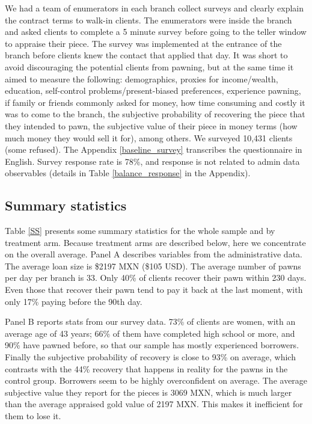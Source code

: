 \documentclass[oneside,11pt]{article}
\begin{document}
We had a team of enumerators in each branch collect surveys and clearly explain the contract terms to walk-in clients. The enumerators were inside the branch and asked clients to complete a 5 minute survey before going to the teller window to appraise their piece. The survey was implemented at the entrance of the branch before clients knew the contact that applied that day. It was short to avoid discouraging the potential clients from pawning, but at the same time it aimed to measure the following: demographics, proxies for income/wealth, education, self-control problems/present-biased preferences, experience pawning, if family or friends commonly asked for money, how time consuming and costly it was to come to the branch, the subjective probability of recovering the piece that they intended to pawn, the subjective value of their piece in money terms (how much money they would sell it for), among others. We surveyed 10,431 clients (some refused). %
The Appendix \ref{baseline_survey} transcribes the questionnaire in English. Survey response rate is 78\%, and response is not related to admin data observables (details in Table \ref{balance_response} in the Appendix).


\subsection{Summary statistics}

Table \ref{SS} presents some summary statistics for the whole sample and by treatment arm. Because treatment arms are described below, here we concentrate on the overall average. Panel A describes variables from the administrative data. The average loan size is \$2197 MXN (\$105 USD). The average number of pawns per day per branch is 33. Only 40\% of clients recover their pawn within 230 days. Even those that recover their pawn tend to pay it back at the last moment, with only 17\% paying before the 90th day.

Panel B reports stats from our survey data. 73\% of clients are women, with an average age of 43 years; 66\% of them have completed high school or more, and 90\% have pawned before, so that our sample has mostly experienced borrowers. Finally the subjective probability of recovery is close to 93\% on average, which contrasts with the 44\% recovery that happens in reality for the pawns in the control group. Borrowers seem to be highly overconfident on average. The average subjective value they report for the pieces is 3069 MXN, which is much larger than the average appraised gold value of 2197 MXN. This makes it inefficient for them to lose it.
\end{document}
